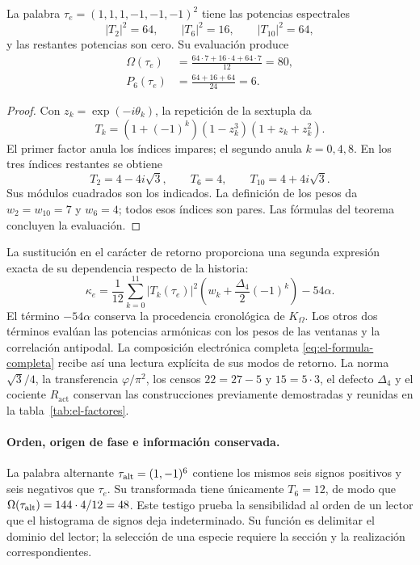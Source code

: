 \begin{corollary}
\label{cor:el-tres-modos}
La palabra \(\tau_e=(1,1,1,-1,-1,-1)^2\) tiene las potencias
espectrales
\begin{equation}
 |T_2|^2=64,\qquad |T_6|^2=16,\qquad |T_{10}|^2=64,
 \label{eq:el-potencias-espectrales}
\end{equation}
y las restantes potencias son cero. Su evaluación produce
\begin{equation}
 \begin{aligned}
 \Omega(\tau_e)&=\frac{64\cdot7+16\cdot4+64\cdot7}{12}=80,\\
 P_6(\tau_e)&=\frac{64+16+64}{24}=6.
 \end{aligned}
 \label{eq:el-evaluacion-espectral}
\end{equation}
\end{corollary}
\begin{proof}
Con \(z_k=\exp(-i\theta_k)\), la repetición de la sextupla da
\[
 T_k=(1+(-1)^k)(1-z_k^3)(1+z_k+z_k^2).
\]
El primer factor anula los índices impares; el segundo anula
\(k=0,4,8\). En los tres índices restantes se obtiene
\[
 T_2=4-4i\sqrt3,\qquad T_6=4,\qquad T_{10}=4+4i\sqrt3.
\]
Sus módulos cuadrados son los indicados. La definición de los
pesos da \(w_2=w_{10}=7\) y \(w_6=4\); todos esos índices son
pares. Las fórmulas del teorema concluyen la evaluación.
\end{proof}

La sustitución en el carácter de retorno proporciona una segunda
expresión exacta de su dependencia respecto de la historia:
\begin{equation}
 \kappa_e=
 \frac1{12}\sum_{k=0}^{11}|T_k(\tau_e)|^2
       \left(w_k+\frac{\Delta_4}{2}(-1)^k\right)-54\alpha.
 \label{eq:el-kappa-espectral}
\end{equation}
El término \(-54\alpha\) conserva la procedencia cronológica
de \(K_\Omega\). Los otros dos términos evalúan las potencias
armónicas con los pesos de las ventanas y la correlación
antipodal. La composición electrónica completa
\eqref{eq:el-formula-completa} recibe así una lectura explícita
de sus modos de retorno. La norma \(\sqrt3/4\), la transferencia
\(\varphi/\pi^2\), los censos \(22=27-5\) y \(15=5\cdot3\),
el defecto \(\Delta_4\) y el cociente \(R_{\mathrm{act}}\)
conservan las construcciones previamente demostradas y reunidas en
la tabla~\ref{tab:el-factores}.

\paragraph{Orden, origen de fase e información conservada.}
La palabra alternante \(\tau_{\rm alt}=(1,-1)^6\) contiene los
mismos seis signos positivos y seis negativos que \(\tau_e\).
Su transformada tiene únicamente \(T_6=12\), de modo que
\(\Omega(\tau_{\rm alt})=144\cdot4/12=48\).
Este testigo prueba la sensibilidad al orden de un lector que
el histograma de signos deja indeterminado. Su función es delimitar
el dominio del lector; la selección de una especie requiere la
sección y la realización correspondientes.

